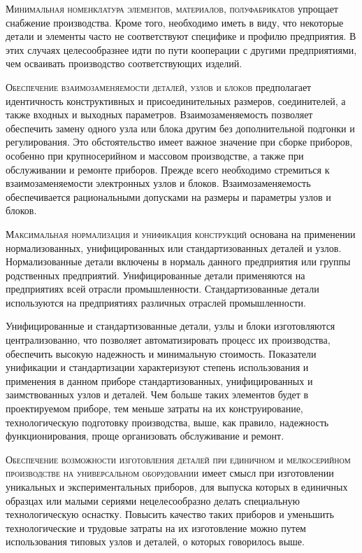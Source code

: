 \textsc{Минимальная номенклатура элементов, материалов, полуфабрикатов} упрощает снабжение производства. 
Кроме того, необходимо иметь в виду, что некоторые детали и элементы часто не соответствуют специфике и профилю предприятия. В этих случаях целесообразнее идти по пути кооперации с другими предприятиями, чем осваивать производство соответствующих изделий.

\textsc{Обеспечение взаимозаменяемости деталей, узлов и блоков} предполагает идентичность конструктивных и присоединительных размеров, соединителей, а также входных и выходных параметров. Взаимозаменяемость позволяет обеспечить замену одного узла или блока другим без дополнительной подгонки и регулирования. Это обстоятельство имеет важное значение при сборке приборов, особенно при крупносерийном и массовом производстве, а также при обслуживании и ремонте приборов. Прежде всего необходимо стремиться к взаимозаменяемости электронных узлов и блоков. Взаимозаменяемость обеспечивается рациональными допусками на размеры и параметры узлов и блоков.

\textsc{Максимальная нормализация и унификация конструкций} основана на применении нормализованных, унифицированных или стандартизованных деталей и узлов. Нормализованные детали включены в нормаль данного предприятия или группы родственных предприятий. Унифицированные детали применяются на предприятиях всей отрасли промышленности. Стандартизованные детали используются на предприятиях различных отраслей промышленности.

Унифицированные и стандартизованные детали, узлы и блоки изготовляются централизованно, что позволяет автоматизировать процесс их производства, обеспечить высокую надежность и минимальную стоимость. Показатели унификации и стандартизации характеризуют степень использования и применения в данном приборе стандартизованных, унифицированных и заимствованных узлов и деталей. Чем больше таких элементов будет в проектируемом приборе, тем меньше затраты на их конструирование, технологическую подготовку производства, выше, как правило, надежность функционирования, проще организовать обслуживание и ремонт.

\textsc{Обеспечение возможности изготовления деталей при единичном и мелкосерийном производстве на универсальном оборудовании} имеет смысл при изготовлении уникальных и экспериментальных приборов, для выпуска которых в единичных образцах или малыми сериями нецелесообразно делать специальную технологическую оснастку. Повысить качество таких приборов и уменьшить технологические и трудовые затраты на их изготовление можно путем использования типовых узлов и деталей, о которых говорилось выше.

